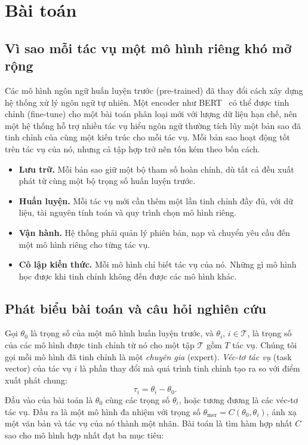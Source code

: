 \chapter{Bài toán}
\label{ch:problem}

\section{Vì sao mỗi tác vụ một mô hình riêng khó mở rộng}

Các mô hình ngôn ngữ huấn luyện trước (pre-trained) đã thay đổi cách xây dựng hệ thống xử lý ngôn ngữ tự nhiên. Một encoder như BERT~\cite{devlin2019bert} có thể được tinh chỉnh (fine-tune) cho một bài toán phân loại mới với lượng dữ liệu hạn chế, nên một hệ thống hỗ trợ nhiều tác vụ hiểu ngôn ngữ thường tích lũy một bản sao đã tinh chỉnh của cùng một kiến trúc cho mỗi tác vụ. Mỗi bản sao hoạt động tốt trên tác vụ của nó, nhưng cả tập hợp trở nên tốn kém theo bốn cách.

\begin{itemize}
  \item \textbf{Lưu trữ.} Mỗi bản sao giữ một bộ tham số hoàn chỉnh, dù tất cả đều xuất phát từ cùng một bộ trọng số huấn luyện trước.
  \item \textbf{Huấn luyện.} Mỗi tác vụ mới cần thêm một lần tinh chỉnh đầy đủ, với dữ liệu, tài nguyên tính toán và quy trình chọn mô hình riêng.
  \item \textbf{Vận hành.} Hệ thống phải quản lý phiên bản, nạp và chuyển yêu cầu đến một mô hình riêng cho từng tác vụ.
  \item \textbf{Cô lập kiến thức.} Mỗi mô hình chỉ biết tác vụ của nó. Những gì mô hình học được khi tinh chỉnh không đến được các mô hình khác.
\end{itemize}

\section{Phát biểu bài toán và câu hỏi nghiên cứu}
\label{sec:problem}

Gọi $\theta_0$ là trọng số của một mô hình huấn luyện trước, và $\theta_i$, $i\in\mathcal{T}$, là trọng số của các mô hình được tinh chỉnh từ nó cho một tập $\mathcal{T}$ gồm $T$ tác vụ. Chúng tôi gọi mỗi mô hình đã tinh chỉnh là một \emph{chuyên gia} (expert). \emph{Véc-tơ tác vụ} (task vector) của tác vụ $i$ là phần thay đổi mà quá trình tinh chỉnh tạo ra so với điểm xuất phát chung:
\begin{equation}
\tau_i=\theta_i-\theta_0 .
\label{eq:task-vector}
\end{equation}
Đầu vào của bài toán là $\theta_0$ cùng các trọng số $\theta_i$, hoặc tương đương là các véc-tơ tác vụ. Đầu ra là một mô hình đa nhiệm với trọng số $\theta_{\mathrm{mer}}=C(\theta_0,\theta_i)$, ánh xạ một văn bản và tác vụ của nó thành một nhãn. Bài toán là tìm hàm hợp nhất $C$ sao cho mô hình hợp nhất đạt ba mục tiêu:

